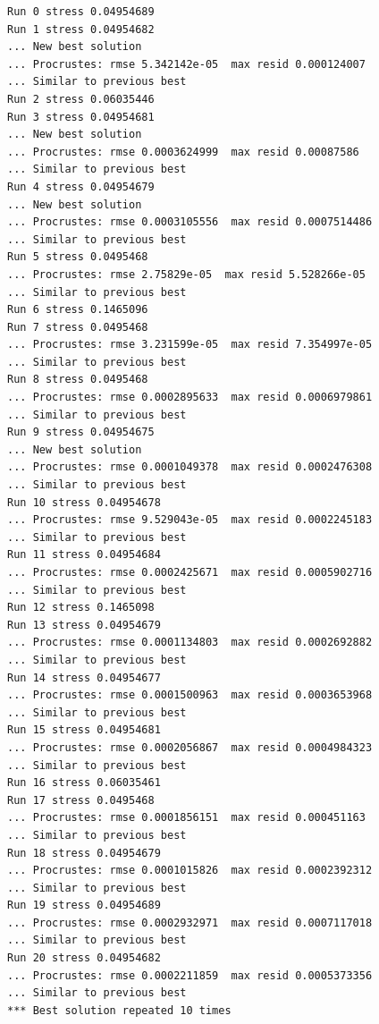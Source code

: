 \documentclass[
  letterpaper,
  DIV=11,
  numbers=noendperiod]{scrartcl}
\begin{document}
\begin{verbatim}
Run 0 stress 0.04954689 
Run 1 stress 0.04954682 
... New best solution
... Procrustes: rmse 5.342142e-05  max resid 0.000124007 
... Similar to previous best
Run 2 stress 0.06035446 
Run 3 stress 0.04954681 
... New best solution
... Procrustes: rmse 0.0003624999  max resid 0.00087586 
... Similar to previous best
Run 4 stress 0.04954679 
... New best solution
... Procrustes: rmse 0.0003105556  max resid 0.0007514486 
... Similar to previous best
Run 5 stress 0.0495468 
... Procrustes: rmse 2.75829e-05  max resid 5.528266e-05 
... Similar to previous best
Run 6 stress 0.1465096 
Run 7 stress 0.0495468 
... Procrustes: rmse 3.231599e-05  max resid 7.354997e-05 
... Similar to previous best
Run 8 stress 0.0495468 
... Procrustes: rmse 0.0002895633  max resid 0.0006979861 
... Similar to previous best
Run 9 stress 0.04954675 
... New best solution
... Procrustes: rmse 0.0001049378  max resid 0.0002476308 
... Similar to previous best
Run 10 stress 0.04954678 
... Procrustes: rmse 9.529043e-05  max resid 0.0002245183 
... Similar to previous best
Run 11 stress 0.04954684 
... Procrustes: rmse 0.0002425671  max resid 0.0005902716 
... Similar to previous best
Run 12 stress 0.1465098 
Run 13 stress 0.04954679 
... Procrustes: rmse 0.0001134803  max resid 0.0002692882 
... Similar to previous best
Run 14 stress 0.04954677 
... Procrustes: rmse 0.0001500963  max resid 0.0003653968 
... Similar to previous best
Run 15 stress 0.04954681 
... Procrustes: rmse 0.0002056867  max resid 0.0004984323 
... Similar to previous best
Run 16 stress 0.06035461 
Run 17 stress 0.0495468 
... Procrustes: rmse 0.0001856151  max resid 0.000451163 
... Similar to previous best
Run 18 stress 0.04954679 
... Procrustes: rmse 0.0001015826  max resid 0.0002392312 
... Similar to previous best
Run 19 stress 0.04954689 
... Procrustes: rmse 0.0002932971  max resid 0.0007117018 
... Similar to previous best
Run 20 stress 0.04954682 
... Procrustes: rmse 0.0002211859  max resid 0.0005373356 
... Similar to previous best
*** Best solution repeated 10 times
\end{verbatim}
\end{document}
